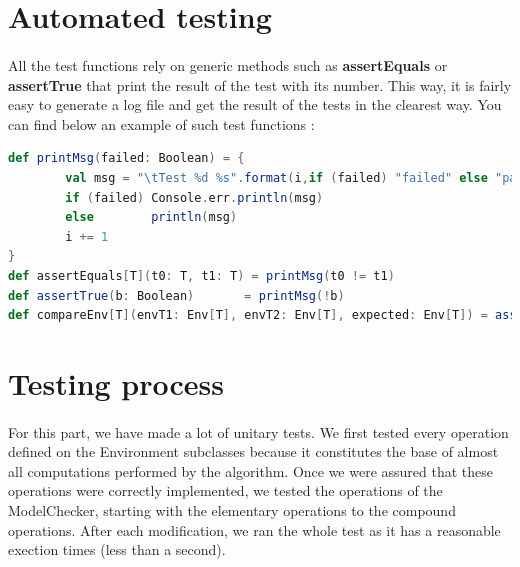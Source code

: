 \documentclass{report}
\begin{document}
\section{Automated testing}

\paragraph{}
\hspace{4mm}\textnormal{All the test functions rely on generic methods such as \textbf{assertEquals} or \textbf{assertTrue} that print
the result of the test with its number. This way, it is fairly easy to generate a log file and get the result of the tests
in the clearest way. You can find below an example of such test functions :}

\begin{lstlisting}[language=scala]
def printMsg(failed: Boolean) = { 
        val msg = "\tTest %d %s".format(i,if (failed) "failed" else "passed") 
        if (failed) Console.err.println(msg)
        else        println(msg)
        i += 1
}
def assertEquals[T](t0: T, t1: T) = printMsg(t0 != t1)
def assertTrue(b: Boolean)       = printMsg(!b)
def compareEnv[T](envT1: Env[T], envT2: Env[T], expected: Env[T]) = assertEquals(envT1 interEnv envT2,    def testNeg[T](env: Env[T], envs: Env[T]*)  = assertEquals(!env,Set(envs: _*))
\end{lstlisting}
\section{Testing process}

\paragraph{}
\hspace{4mm}\textnormal{For this part, we have made a lot of unitary tests. We first tested every operation defined on the Environment subclasses
because it constitutes the base of almost all computations performed by the algorithm. Once we were assured that these operations were correctly implemented,
we tested the operations of the ModelChecker, starting with the elementary operations to the compound operations. 
After each modification, we ran the whole test as it has a reasonable exection times (less than a second).}
\end{document}
